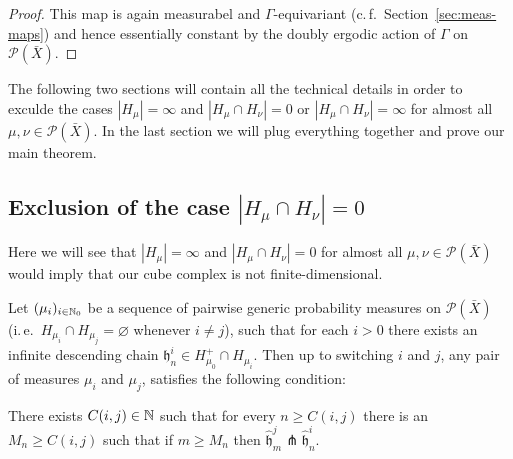 \begin{proof}
  This map is again measurabel and \(\Gamma\)-equivariant (c.\,f.~Section~\ref{sec:meas-maps}) and hence essentially constant by the doubly ergodic action of \(\Gamma\) on \(\mathcal{P}(\bar X)\).
\end{proof}

The following two sections will contain all the technical details in order to exculde the cases \(|H_\mu| = \infty\) and \(|H_\mu \cap H_\nu| = 0\) or \(|H_\mu \cap H_\nu| = \infty\) for almost all \(\mu, \nu \in \mathcal{P}(\bar X)\). In the last section we will plug everything together and prove our main theorem.

\subsection{Exclusion of the case \(|H_\mu \cap H_\nu| = 0\)}
\label{sec:M=0}

Here we will see that \(|H_\mu| = \infty\) and \(|H_\mu \cap H_\nu| = 0\) for almost all \(\mu, \nu \in \mathcal{P}(\bar X)\) would imply that our cube complex is not finite-dimensional.

\begin{lemma}[{\cite[Lemma~4.13]{MR3509968}}]
  \label{lem:4.13}
  Let \((\mu_i)_{i \in \mathbb{N}_0}\) be a sequence of pairwise generic probability measures on \(\mathcal{P}(\bar X)\) (i.\,e.\ \(H_{\mu_i} \cap H_{\mu_j} = \varnothing\) whenever \(i \neq j\)), such that for each \(i > 0\) there exists an infinite descending chain \(\mathfrak{h}_n^i \in H_{\mu_0}^+ \cap H_{\mu_i}\). Then up to switching \(i\) and \(j\), any pair of measures \(\mu_i\) and \(\mu_j\), satisfies the following condition:

  There exists \(C(i,j) \in \mathbb{N}\) such that for every \(n \geq C(i,j)\) there is an \(M_n \geq C(i,j)\) such that if \(m \geq M_n\) then \(\mathfrak{\hat h}^j_m \pitchfork \mathfrak{\hat h}^i_n\). 
\end{lemma}

